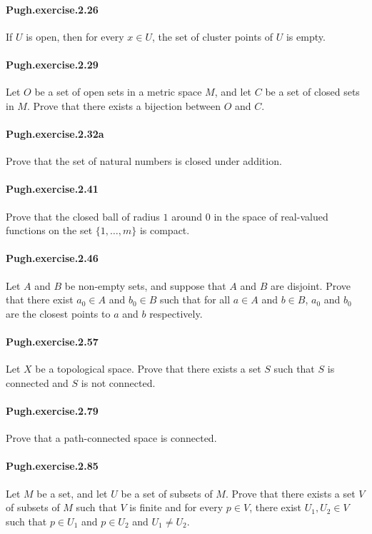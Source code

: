 \documentclass{article}
\begin{document}
\paragraph{Pugh.exercise.2.26} If $U$ is open, then for every $x \in U$, the set of cluster points of $U$ is empty.

\paragraph{Pugh.exercise.2.29} Let $O$ be a set of open sets in a metric space $M$, and let $C$ be a set of closed sets in $M$. Prove that there exists a bijection between $O$ and $C$.

\paragraph{Pugh.exercise.2.32a} Prove that the set of natural numbers is closed under addition.

\paragraph{Pugh.exercise.2.41} Prove that the closed ball of radius $1$ around $0$ in the space of real-valued functions on the set $\{1, \dots, m\}$ is compact.

\paragraph{Pugh.exercise.2.46} Let $A$ and $B$ be non-empty sets, and suppose that $A$ and $B$ are disjoint. Prove that there exist $a_0 \in A$ and $b_0 \in B$ such that for all $a \in A$ and $b \in B$, $a_0$ and $b_0$ are the closest points to $a$ and $b$ respectively.

\paragraph{Pugh.exercise.2.57} Let $X$ be a topological space. Prove that there exists a set $S$ such that $S$ is connected and $S$ is not connected.

\paragraph{Pugh.exercise.2.79} Prove that a path-connected space is connected.

\paragraph{Pugh.exercise.2.85} Let $M$ be a set, and let $U$ be a set of subsets of $M$. Prove that there exists a set $V$ of subsets of $M$ such that $V$ is finite and for every $p \in V$, there exist $U_1, U_2 \in V$ such that $p \in U_1$ and $p \in U_2$ and $U_1 \neq U_2$.
\end{document}
